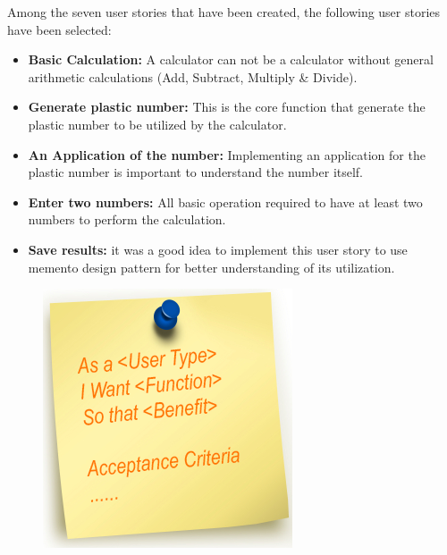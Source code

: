 \documentclass[final]{beamer}
\newlength{\onecolwid}
\let\olditem=\item%
\renewcommand{\item}{\olditem \justifying}%
\begin{document}
\begin{frame}
\begin{columns}[t]
\begin{column}{\onecolwid}
Among the seven user stories that have been created, the following user stories have been selected:\newline
\begin{itemize}
\item \textbf{Basic Calculation:} A calculator can not be a calculator without general arithmetic calculations (Add, Subtract, Multiply \& Divide).\newline 
\item \textbf{Generate plastic number:} This is the core function that generate the plastic number to be utilized by the calculator.\newline 
\item \textbf{An Application of the number:} Implementing an application for the plastic number is important to understand the number itself.\newline 
\item \textbf{Enter two numbers:} All basic operation required to have at least two numbers to perform the calculation.\newline 
\item \textbf{Save results:} it was a good idea to implement this user story to use memento design pattern for better understanding of its utilization.\newline
\end{itemize}

\begin{figure}
\includegraphics[width=0.8\linewidth,height=0.5\linewidth]{img/userstory4.png}\newline
\end{figure}






\end{column}
\end{columns}
\end{frame}
\end{document}
